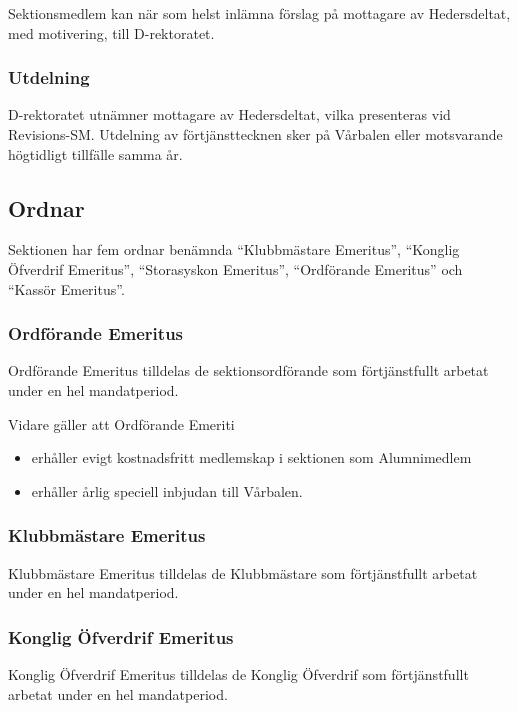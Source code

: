 \documentclass{dgovdoc}
\begin{document}
Sektionsmedlem kan när som helst inlämna förslag på mottagare av Hedersdeltat,
med motivering, till D-rektoratet.

\subsubsection{Utdelning}

D-rektoratet utnämner mottagare av Hedersdeltat, vilka presenteras vid
Revisions-SM. Utdelning av förtjänsttecknen sker på Vårbalen eller motsvarande
högtidligt tillfälle samma år.

\subsection{Ordnar}

Sektionen har fem ordnar benämnda ``Klubbmästare Emeritus'', ``Konglig
Öfverdrif Emeritus'', ``Storasyskon Emeritus'', ``Ordförande Emeritus'' och ``Kassör Emeritus''.

\subsubsection{Ordförande Emeritus}

Ordförande Emeritus tilldelas de sektionsordförande som förtjänstfullt arbetat
under en hel mandatperiod.

Vidare gäller att Ordförande Emeriti

\begin{itemize}
  \item erhåller evigt kostnadsfritt medlemskap i sektionen som Alumnimedlem
  \item erhåller årlig speciell inbjudan till Vårbalen.
\end{itemize}

\subsubsection{Klubbmästare Emeritus}

Klubbmästare Emeritus tilldelas de Klubbmästare som förtjänstfullt arbetat
under en hel mandatperiod.

\subsubsection{Konglig Öfverdrif Emeritus}

Konglig Öfverdrif Emeritus tilldelas de Konglig Öfverdrif som förtjänstfullt
arbetat under en hel mandatperiod.
\end{document}
